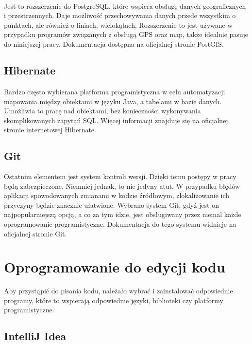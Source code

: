 \paragraph{} 
Jest to rozszerzenie do PostgreSQL, które wspiera obsługę danych geograficznych i przestrzennych. Daje możliwość przechowywania danych przede wszystkim o punktach, ale również o liniach, wielokątach. Rozszerzenie to jest używane w przypadku programów związanych z obsługą GPS oraz map, także idealnie pasuje do niniejszej pracy. Dokumentacja dostępna na oficjalnej stronie PostGIS.

\subsection{Hibernate}
\paragraph{}
Bardzo często wybierana platforma programistyczna w celu automatyzacji mapowania między obiektami w języku Java, a tabelami w bazie danych. Umożliwia to pracę nad obiektami, bez konieczności wykonywania skomplikowanych zapytań SQL. Więcej informacji znajduje się na oficjalnej stronie internetowej Hibernate.

\subsection{Git}
Ostatnim elementem jest system kontroli wersji. Dzięki temu postępy w pracy będą zabezpieczone. Niemniej jednak, to nie jedyny atut. W przypadku błędów aplikacji spowodowanych zmianami w kodzie źródłowym, zlokalizowanie ich przyczyny będzie znacznie ułatwione. Wybrano system Git, gdyż jest on najpopularniejszą opcją, a co za tym idzie, jest obsługiwany przez niemal każde oprogramowanie programistyczne. Dokumentacja do tego systemu widnieje na oficjalnej stronie Git.

\section{Oprogramowanie do edycji kodu}
\paragraph{}
Aby przystąpić do pisania kodu, należało wybrać i zainstalować odpowiednie programy, które to wspierają odpowiednie języki, biblioteki czy platformy programistyczne.

\subsection{IntelliJ Idea}

